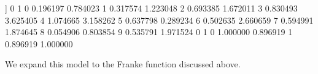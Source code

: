 \documentclass[letterpaper,10pt,english]{sphinxmanual}
\begin{document}
\begin{sphinxVerbatim}[commandchars=\\\{\}]
[[ 0.19619662 \PYGZhy{}0.78402323]
 [ 0.31757369  1.22304781]
 [\PYGZhy{}0.69338544 \PYGZhy{}1.67201132]
 [\PYGZhy{}0.83049344 \PYGZhy{}3.62540546]
 [ 1.07466493  3.158262  ]
 [\PYGZhy{}0.63779754 \PYGZhy{}0.28923407]
 [\PYGZhy{}0.50263516 \PYGZhy{}2.66065903]
 [ 0.59499124  1.87464536]
 [\PYGZhy{}0.05490614  0.80385431]
 [ 0.53579124  1.97152362]]
          0         1
0  0.196197 \PYGZhy{}0.784023
1  0.317574  1.223048
2 \PYGZhy{}0.693385 \PYGZhy{}1.672011
3 \PYGZhy{}0.830493 \PYGZhy{}3.625405
4  1.074665  3.158262
5 \PYGZhy{}0.637798 \PYGZhy{}0.289234
6 \PYGZhy{}0.502635 \PYGZhy{}2.660659
7  0.594991  1.874645
8 \PYGZhy{}0.054906  0.803854
9  0.535791  1.971524
          0         1
0  1.000000  0.896919
1  0.896919  1.000000
\end{sphinxVerbatim}

We expand this model to the Franke function discussed above.
\end{document}
